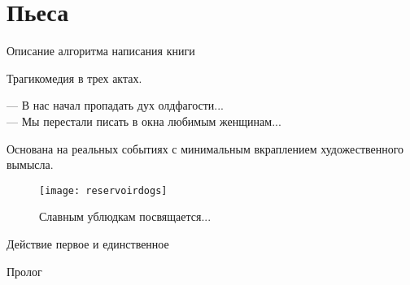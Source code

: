 \section*{Пьеса}
\begin{center}
    { \Large Описание алгоритма написания книги }

    Трагикомедия в трех актах.
\end{center}

\begin{epigraph}
    --- В нас начал пропадать дух олдфагости...\\
    --- Мы перестали писать в окна любимым женщинам...
\end{epigraph}

Основана на реальных событиях с минимальным вкраплением художественного вымысла.\\

\begin{figure}[ht!]
    \centering
    \texttt{[image: reservoirdogs]}
    \caption{Славным ублюдкам посвящается...}
\end{figure}

\begin{center}
    \Large Действие первое и единственное %
\end{center}

\begin{center}
    \large Пролог
\end{center}

\vspace{1ex}



